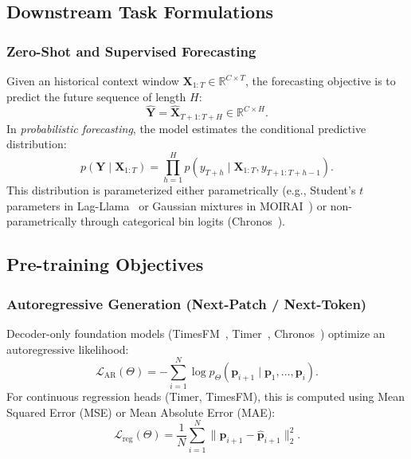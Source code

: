 \subsection{Downstream Task Formulations}

\subsubsection{Zero-Shot and Supervised Forecasting}
Given an historical context window $\mathbf{X}_{1:T} \in \mathbb{R}^{C \times T}$, the forecasting objective is to predict the future sequence of length $H$:
\begin{equation}
    \widehat{\mathbf{Y}} = \widehat{\mathbf{X}}_{T+1:T+H} \in \mathbb{R}^{C \times H}.
\end{equation}
In \emph{probabilistic forecasting}, the model estimates the conditional predictive distribution:
\begin{equation}
    p(\mathbf{Y} \mid \mathbf{X}_{1:T}) = \prod_{h=1}^H p(y_{T+h} \mid \mathbf{X}_{1:T}, y_{T+1:T+h-1}).
\end{equation}
This distribution is parameterized either parametrically (e.g., Student's $t$ parameters in Lag-Llama~\cite{rasul2023lagllama} or Gaussian mixtures in MOIRAI~\cite{woo2024moirai}) or non-parametrically through categorical bin logits (Chronos~\cite{ansari2024chronos}).

\subsection{Pre-training Objectives}

\subsubsection{Autoregressive Generation (Next-Patch / Next-Token)}
Decoder-only foundation models (TimesFM~\cite{das2024timesfm}, Timer~\cite{liu2024timer}, Chronos~\cite{ansari2024chronos}) optimize an autoregressive likelihood:
\begin{equation}
    \mathcal{L}_{\text{AR}}(\Theta) = -\sum_{i=1}^N \log p_\Theta(\mathbf{p}_{i+1} \mid \mathbf{p}_1, \dots, \mathbf{p}_i).
\end{equation}
For continuous regression heads (Timer, TimesFM), this is computed using Mean Squared Error (MSE) or Mean Absolute Error (MAE):
\begin{equation}
    \mathcal{L}_{\text{reg}}(\Theta) = \frac{1}{N} \sum_{i=1}^N \|\mathbf{p}_{i+1} - \widehat{\mathbf{p}}_{i+1}\|_2^2.
\end{equation}

